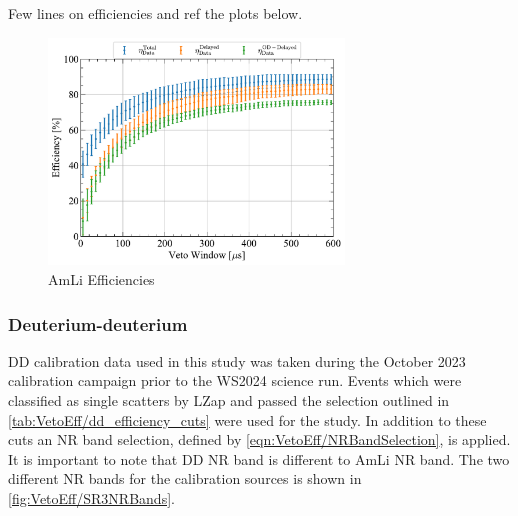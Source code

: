 {\color{red}Few lines on efficiencies and ref the plots below.}
\begin{figure}[!ht]
    \centering
    \includegraphics[width=0.7\textwidth]{figures/VetoEfficiency/AmLiEfficiencies_Data.pdf}
    \caption{AmLi Efficiencies}
    \label{fig:VetoEff/AmLiEfficiencies}
\end{figure}

\subsubsection{Deuterium-deuterium}
DD calibration data used in this study was taken during the October 2023 calibration campaign prior to the WS2024 science run. Events which were classified as single scatters by LZap and passed the selection outlined in \autoref{tab:VetoEff/dd_efficiency_cuts} were used for the study. In addition to these cuts an NR band selection, defined by \autoref{eqn:VetoEff/NRBandSelection}, is applied. It is important to note that DD NR band is different to AmLi NR band. The two different NR bands for the calibration sources is shown in \autoref{fig:VetoEff/SR3NRBands}.

